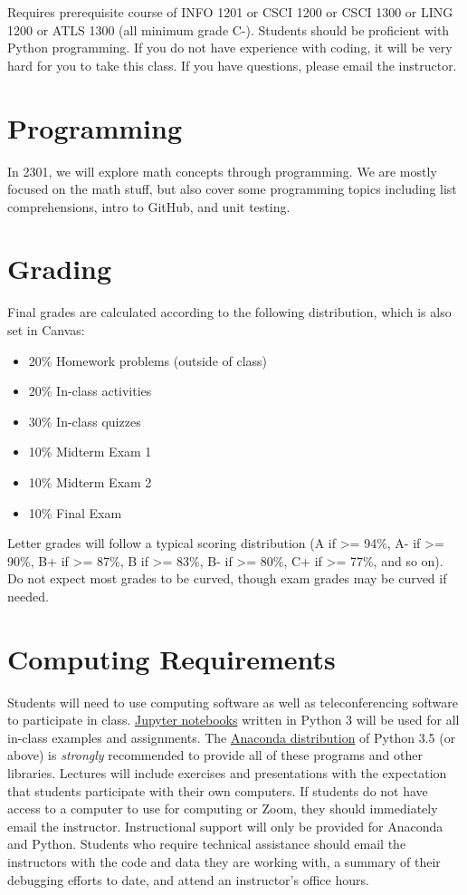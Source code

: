 \documentclass[10pt]{memoir}
\begin{document}
Requires prerequisite course of INFO 1201 or CSCI 1200 or CSCI 1300 or LING 1200 or ATLS 1300 (all minimum grade C-). Students should be proficient with Python programming. If you do not have experience with coding, it will be very hard for you to take this class. If you have questions, please email the instructor.

\section{\textbf{Programming}}
In 2301, we will explore math concepts through programming. We are mostly focused on the math stuff, but also cover some programming topics including list comprehensions, intro to GitHub, and unit testing.


\section{\textbf{Grading}}

Final grades are calculated according to the following distribution, which is also set in Canvas:

\begin{itemize}
\item 20\% Homework problems (outside of class)
\item 20\% In-class activities
\item 30\% In-class quizzes
\item 10\% Midterm Exam 1
\item 10\% Midterm Exam 2
\item 10\% Final Exam
\end{itemize}

Letter grades will follow a typical scoring distribution (A if >= 94\%, A- if >= 90\%, B+ if >=
87\%, B if >= 83\%, B- if >= 80\%, C+ if >= 77\%, and so on). Do not expect most grades to be
curved, though exam grades may be curved if needed.

\section{\textbf{Computing Requirements}}
Students will need to use computing software as well as teleconferencing software to participate in class. \href{http://jupyter.org/}{Jupyter notebooks} written in Python 3 will be used for all in-class examples and assignments. The \href{https://www.continuum.io/why-anaconda}{Anaconda distribution} of Python 3.5 (or above) is \textit{strongly} recommended to provide all of these programs and other libraries. Lectures will include exercises and presentations with the expectation that students participate with their own computers. If students do not have access to a computer to use for computing or Zoom, they should immediately email the instructor. Instructional support will only be provided for Anaconda and Python. Students who require technical assistance should email the instructors with the code and data they are working with, a summary of their debugging efforts to date, and attend an instructor's office hours.
\end{document}
